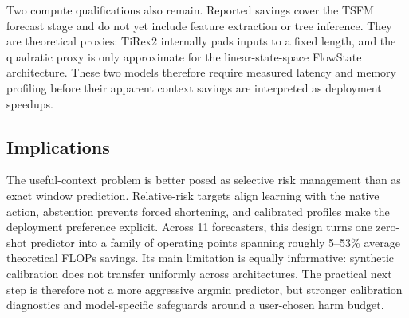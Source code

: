 Two compute qualifications also remain.  Reported savings cover the TSFM
forecast stage and do not yet include feature extraction or tree inference.
They are theoretical proxies: TiRex2 internally pads inputs to a fixed length,
and the quadratic proxy is only approximate for the linear-state-space
FlowState architecture.  These two models therefore require measured latency
and memory profiling before their apparent context savings are interpreted as
deployment speedups.

\subsection{Implications}
\label{sec:risk-implications}

The useful-context problem is better posed as selective risk management than
as exact window prediction.  Relative-risk targets align learning with the
native action, abstention prevents forced shortening, and calibrated profiles
make the deployment preference explicit.  Across 11 forecasters, this design
turns one zero-shot predictor into a family of operating points spanning
roughly 5--53\% average theoretical FLOPs savings.  Its main limitation is
equally informative: synthetic calibration does not transfer uniformly across
architectures.  The practical next step is therefore not a more aggressive
argmin predictor, but stronger calibration diagnostics and model-specific
safeguards around a user-chosen harm budget.
